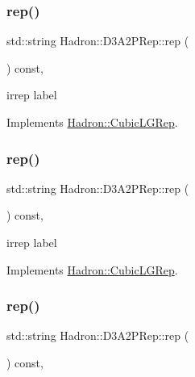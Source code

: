 \subsubsection{\texorpdfstring{rep()}{rep()}\hspace{0.1cm}{\footnotesize\ttfamily [1/3]}}
{\footnotesize\ttfamily std\+::string Hadron\+::\+D3\+A2\+P\+Rep\+::rep (\begin{DoxyParamCaption}{ }\end{DoxyParamCaption}) const\hspace{0.3cm}{\ttfamily [inline]}, {\ttfamily [virtual]}}

irrep label 

Implements \mbox{\hyperlink{structHadron_1_1CubicLGRep_a50f5ddbb8f4be4cee0106fa9e8c75e6c}{Hadron\+::\+Cubic\+L\+G\+Rep}}.

\mbox{\label{structHadron_1_1D3A2PRep_a8a5821f9be07ae2bd87e63ac151c6d68}} 
\subsubsection{\texorpdfstring{rep()}{rep()}\hspace{0.1cm}{\footnotesize\ttfamily [2/3]}}
{\footnotesize\ttfamily std\+::string Hadron\+::\+D3\+A2\+P\+Rep\+::rep (\begin{DoxyParamCaption}{ }\end{DoxyParamCaption}) const\hspace{0.3cm}{\ttfamily [inline]}, {\ttfamily [virtual]}}

irrep label 

Implements \mbox{\hyperlink{structHadron_1_1CubicLGRep_a50f5ddbb8f4be4cee0106fa9e8c75e6c}{Hadron\+::\+Cubic\+L\+G\+Rep}}.

\mbox{\label{structHadron_1_1D3A2PRep_a8a5821f9be07ae2bd87e63ac151c6d68}} 
\subsubsection{\texorpdfstring{rep()}{rep()}\hspace{0.1cm}{\footnotesize\ttfamily [3/3]}}
{\footnotesize\ttfamily std\+::string Hadron\+::\+D3\+A2\+P\+Rep\+::rep (\begin{DoxyParamCaption}{ }\end{DoxyParamCaption}) const\hspace{0.3cm}{\ttfamily [inline]}, {\ttfamily [virtual]}}

